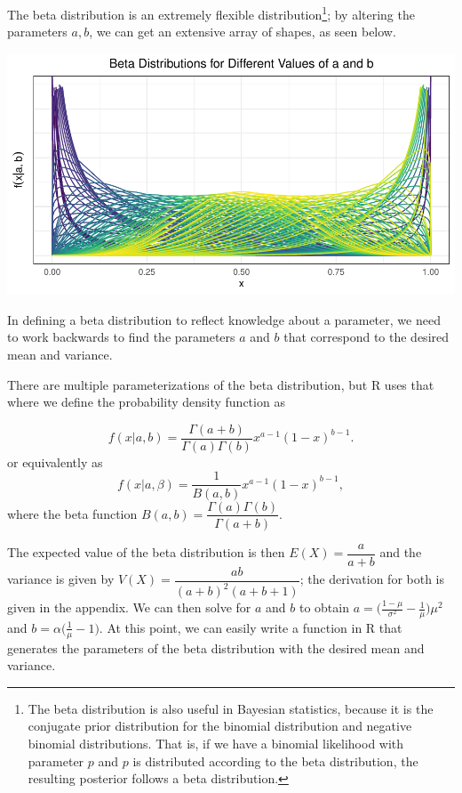\documentclass[12pt,twoside]{smiththesis}
\begin{document}
The beta distribution is an extremely flexible distribution\footnote{The beta distribution is also useful in Bayesian statistics, because it is the conjugate prior distribution for the binomial distribution and negative binomial distributions. That is, if we have a binomial likelihood with parameter \(p\) and \(p\) is distributed according to the beta distribution, the resulting posterior follows a beta distribution.}; by altering the parameters \(a,b\), we can get an extensive array of shapes, as seen below.
\begin{center}\includegraphics[width=0.9\linewidth]{thesis_files/figure-latex/unnamed-chunk-51-1} \end{center}

In defining a beta distribution to reflect knowledge about a parameter, we need to work backwards to find the parameters \(a\) and \(b\) that correspond to the desired mean and variance.

There are multiple parameterizations of the beta distribution, but R uses that where we define the probability density function as

\[
f(x|a,b) = \dfrac{\Gamma(a + b)}{\Gamma(a) \Gamma(b)} x^{a - 1} (1-x)^{b - 1}.
\]
or equivalently as
\[
f(x|a,\beta) = \dfrac{1}{B(a,b)} x^{a - 1} (1-x)^{b - 1},
\]
where the beta function \(B(a, b) = \dfrac{\Gamma(a)\Gamma(b) }{\Gamma ( a + b)}\).

The expected value of the beta distribution is then \(E(X) = \dfrac{a}{a + b}\) and the variance is given by \(V(X) = \dfrac{a b}{(a + b)^2(a +b + 1)}\); the derivation for both is given in the appendix. We can then solve for \(a\) and \(b\) to obtain \(a = \Big(\frac{1-\mu}{\sigma^2} - \frac{1}{\mu}\Big) \mu^2\) and \(b = \alpha\Big(\frac{1}{\mu} - 1\Big)\). At this point, we can easily write a function in R that generates the parameters of the beta distribution with the desired mean and variance.
\end{document}
